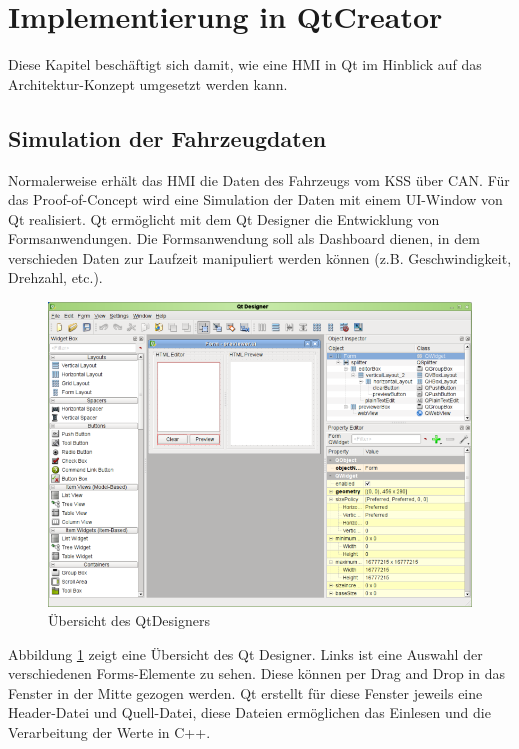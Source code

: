 \section{Implementierung in QtCreator}\label{hauptabschnitt_2}

Diese Kapitel beschäftigt sich damit, wie eine \ac{HMI} in Qt im Hinblick auf das Architektur-Konzept umgesetzt werden kann.\\

\subsection{Simulation der Fahrzeugdaten}
Normalerweise erhält das \ac{HMI} die Daten des Fahrzeugs vom \ac{KSS} über \ac{CAN}. Für das Proof-of-Concept wird eine Simulation der Daten mit einem UI-Window von Qt realisiert. Qt ermöglicht mit dem Qt Designer die Entwicklung von Formsanwendungen. Die Formsanwendung soll als Dashboard dienen, in dem verschieden Daten zur Laufzeit manipuliert werden können (z.B. Geschwindigkeit, Drehzahl, etc.).\\

\begin{figure}[htb]
	\centering
	\includegraphics[width=\textwidth]{img/5_implementierung/qt_designer}
	\caption[Übersicht des QtDesigners]{Übersicht des QtDesigners \cite{qt_designer}}
	\label{fig:qt_designer}
\end{figure}

Abbildung \ref{fig:qt_designer} zeigt eine Übersicht des Qt Designer. Links ist eine Auswahl der verschiedenen Forms-Elemente zu sehen. Diese können per Drag and Drop in das Fenster in der Mitte gezogen werden. Qt erstellt für diese Fenster jeweils eine Header-Datei und Quell-Datei, diese Dateien ermöglichen das Einlesen und die Verarbeitung der Werte in C++.\\


